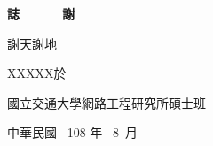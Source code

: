 \begin{center}
\Large
\textbf{誌~~~~~~謝}
\end{center}

\vspace{1cm}
\linespread{2}%
\selectfont
\hspace{0.25cm}

謝天謝地

\vspace{3cm}
\begin{flushright}
XXXXX於

國立交通大學網路工程研究所碩士班

中華民國 \, 108 年 \, 8 \,月
\end{flushright}